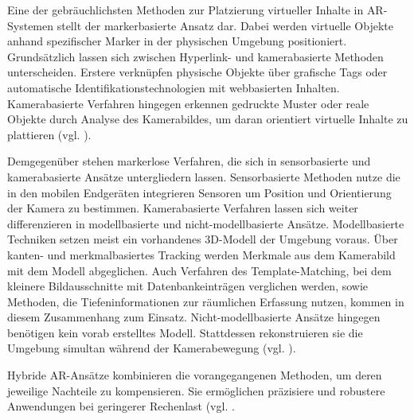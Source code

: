 Eine der gebräuchlichsten Methoden zur Platzierung virtueller Inhalte in \ac{AR}-Systemen stellt der markerbasierte Ansatz dar. 
Dabei werden virtuelle Objekte anhand spezifischer Marker in der physischen Umgebung positioniert. Grundsätzlich lassen sich zwischen Hyperlink- und kamerabasierte Methoden unterscheiden. Erstere verknüpfen physische Objekte über grafische Tags oder automatische Identifikationstechnologien mit webbasierten Inhalten. Kamerabasierte Verfahren hingegen erkennen gedruckte Muster oder reale Objekte durch Analyse des Kamerabildes, um daran orientiert virtuelle Inhalte zu plattieren (vgl. \citealp[S. 3f]{el_barhoumi_assessment_2022}). 

Demgegenüber stehen markerlose Verfahren, die sich in sensorbasierte und kamerabasierte Ansätze untergliedern lassen. Sensorbasierte Methoden nutze die in den mobilen Endgeräten integrieren Sensoren um Position und Orientierung der Kamera zu bestimmen. Kamerabasierte Verfahren lassen sich weiter differenzieren in modellbasierte und nicht-modellbasierte Ansätze. Modellbasierte Techniken setzen meist ein vorhandenes \ac{3D}-Modell der Umgebung voraus. Über kanten- und merkmalbasiertes Tracking werden Merkmale aus dem Kamerabild mit dem Modell abgeglichen. Auch Verfahren des Template-Matching, bei dem kleinere Bildausschnitte mit Datenbankeinträgen verglichen werden, sowie Methoden, die Tiefeninformationen zur räumlichen Erfassung nutzen, kommen in diesem Zusammenhang zum Einsatz. Nicht-modellbasierte Ansätze hingegen benötigen kein vorab erstelltes Modell. Stattdessen rekonstruieren sie die Umgebung simultan während der Kamerabewegung (vgl. \citealp[S. 4f]{el_barhoumi_assessment_2022}).

Hybride \ac{AR}-Ansätze kombinieren die vorangegangenen Methoden, um deren jeweilige Nachteile zu kompensieren. Sie ermöglichen präzisiere und robustere Anwendungen bei geringerer Rechenlast (vgl. \citealp[S. 5]{el_barhoumi_assessment_2022}.